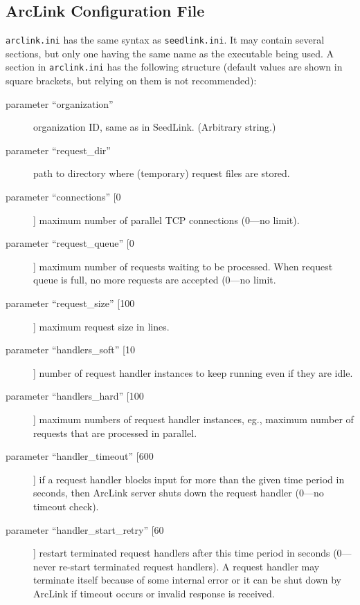 \documentclass[11pt,a4paper,titlepage]{article}
\newcommand{\file}[1]{\texttt{#1}}
\newcommand{\dfl}[1]{[#1]}
\begin{document}
\subsection{ArcLink Configuration File}

\file{arclink.ini} has the same syntax as \file{seedlink.ini}. It may
contain several sections, but only one having the same name as the
executable being used. A section in \file{arclink.ini} has the following
structure (default values are shown in square brackets, but relying on
them is not recommended):
\begin{description}
\item[parameter ``organization''] organization ID, same as in SeedLink.
(Arbitrary string.)

\item[parameter ``request\_dir''] path to directory where (temporary)
request files are stored.

\item[parameter ``connections'' \dfl{0}] maximum number of parallel TCP
connections (0---no limit).

\item[parameter ``request\_queue'' \dfl{0}] maximum number of requests
waiting to be processed. When request queue is full, no more requests are
accepted (0---no limit.

\item[parameter ``request\_size'' \dfl{100}] maximum request size in lines.

\item[parameter ``handlers\_soft'' \dfl{10}] number of request handler
instances to keep running even if they are idle.

\item[parameter ``handlers\_hard'' \dfl{100}] maximum numbers of request
handler instances, eg., maximum number of requests that are processed in
parallel.

\item[parameter ``handler\_timeout'' \dfl{600}] if a request handler blocks
input for more than the given time period in seconds, then ArcLink server
shuts down the request handler (0---no timeout check).

\item[parameter ``handler\_start\_retry'' \dfl{60}] restart terminated
request handlers after this time period in seconds (0---never re-start
terminated request handlers). A request handler may terminate itself
because of some internal error or it can be shut down by ArcLink if timeout
occurs or invalid response is received.


\end{description}
\end{document}
